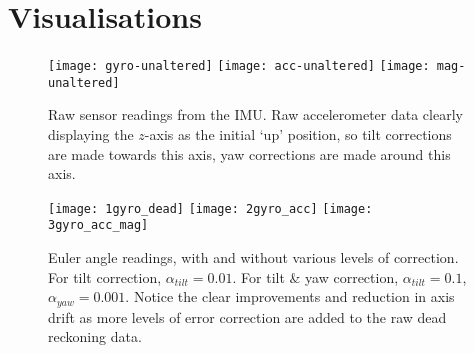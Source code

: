 \documentclass[11pt]{article}
\begin{document}
\section*{Visualisations}

\begin{figure}[htp]

\centering
\texttt{[image: gyro-unaltered]}\hfill
\texttt{[image: acc-unaltered]}\hfill
\texttt{[image: mag-unaltered]}

\caption{Raw sensor readings from the IMU. Raw accelerometer data clearly displaying the $z$-axis as the initial `up' position, so tilt corrections are made towards this axis, yaw corrections are made around this axis.}
\label{fig:raw-readings}

\end{figure}

\begin{figure}[htp]

\centering
\texttt{[image: 1gyro\_dead]}\hfill
\texttt{[image: 2gyro\_acc]}\hfill
\texttt{[image: 3gyro\_acc\_mag]}

\caption{Euler angle readings, with and without various levels of correction. For tilt correction, $\alpha_{tilt}=0.01$. For tilt \& yaw correction, $\alpha_{tilt}=0.1$, $\alpha_{yaw}=0.001$. Notice the clear improvements and reduction in axis drift as more levels of error correction are added to the raw dead reckoning data.}
\label{fig:euler-angles}

\end{figure}
\end{document}
